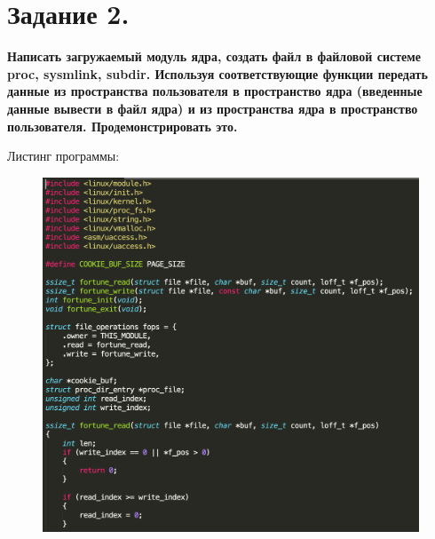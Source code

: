 \documentclass[a4paper,12pt]{article}
\begin{document}
	\section*{Задание 2.}
	
	{\bf Написать загружаемый модуль ядра, создать файл в файловой системе proc,
		sysmlink, subdir. Используя соответствующие функции передать данные из
		пространства пользователя в пространство ядра (введенные данные вывести
		в файл ядра) и из пространства ядра в пространство пользователя.
		Продемонстрировать это.}
	
	\newpage
	
	Листинг программы:
	
	\begin{figure}[h!]
		\begin{center}
			{\includegraphics[scale = 0.7]{fortune1.png}}
			\label{ris:fortune1}
		\end{center}
	\end{figure}

	\newpage
\end{document}
